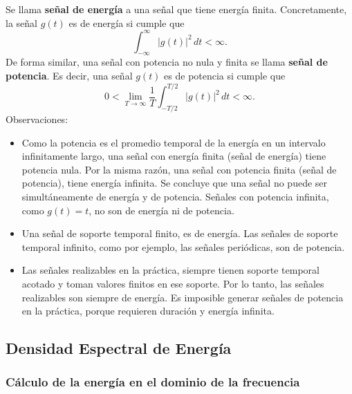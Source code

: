 \documentclass[a4paper]{article}
\begin{document}
Se llama \textbf{señal de energía} a una señal que tiene energía finita. Concretamente, la señal \(g(t)\) es de energía si cumple que
\[
 \int_{-\infty}^{\infty}|g(t)|^2\,dt < \infty.
\]
De forma similar, una señal con potencia no nula y finita se llama \textbf{señal de potencia}. Es decir, una señal \(g(t)\) es de potencia si cumple que
\[
 0 < \lim_{T\to\infty}\frac{1}{T}\int_{-T/2}^{T/2}|g(t)|^2\,dt < \infty.
\]
Observaciones:
\begin{itemize}
  \item Como la potencia es el promedio temporal de la energía en un intervalo infinitamente largo, una señal con energía finita (señal de energía) tiene potencia nula. Por la misma razón, una señal con potencia finita (señal de potencia), tiene energía infinita. Se concluye que una señal no puede ser simultáneamente de energía y de potencia. Señales con potencia infinita, como \(g(t)=t\), no son de energía ni de potencia.
  \item Una señal de soporte temporal finito, es de energía. Las señales de soporte temporal infinito, como por ejemplo, las señales periódicas, son de potencia.
  \item Las señales realizables en la práctica, siempre tienen soporte temporal acotado y toman valores finitos en ese soporte. Por lo tanto, las señales realizables son siempre de energía. Es imposible generar señales de potencia en la práctica, porque requieren duración y energía infinita.
\end{itemize}

\subsection{Densidad Espectral de Energía}

\subsubsection{Cálculo de la energía en el dominio de la frecuencia}
\end{document}
